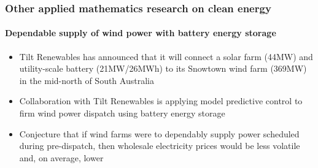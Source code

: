\documentclass[presentation, smaller, xcolor=table]{beamer}
\begin{document}
\begin{frame}
	\frametitle{Other applied mathematics research on clean energy}
	\framesubtitle{Dependable supply of wind power with battery energy storage}
	
	\begin{minipage}{0.55\linewidth}
		\begin{itemize}
			\item  Tilt Renewables has announced that it will connect a solar farm (44MW) and utility-scale battery (21MW/26MWh) to its Snowtown wind farm (369MW) in the mid-north of South Australia
		
			\item  Collaboration with Tilt Renewables is applying model predictive control to firm wind power dispatch using battery energy storage
			
			\item  Conjecture that if wind farms were to dependably supply power scheduled during pre-dispatch, then wholesale electricity prices would be less volatile and, on average, lower 
	
		\end{itemize}
	\end{minipage}%
	\begin{minipage}{0.45\linewidth}
	\end{minipage}

	
\end{frame}


\end{document}
